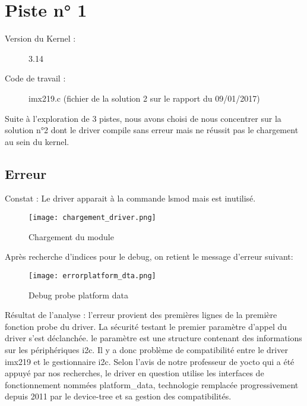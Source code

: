 \chapter{Piste n° 1} %
\label{Chapter2} %

\begin{description}
  \item[Version du Kernel :] 3.14
  \item[Code de travail :] imx219.c (fichier de la solution 2 sur le rapport du
  09/01/2017)
\end{description}

Suite à l'exploration de 3 pistes, nous avons choisi de nous
concentrer sur la solution n°2 dont le driver compile sans erreur mais ne
réussit pas le chargement au sein du kernel.

\section{Erreur}
Constat : Le driver apparait à la commande lsmod mais est inutilisé.

 \begin{figure}[th]
   \centering
   \texttt{[image: chargement\_driver.png]}
   \decoRule
   \caption{Chargement du module}  \label{fig:Chargement-du-module}
\end{figure}

Après recherche d'indices pour le debug, on retient le message d'erreur suivant:
\begin{figure}[th]
  \centering
  \texttt{[image: errorplatform\_dta.png]}
  \decoRule
  \caption{Debug probe platform data}  \label{fig:Debug-probe-platform-data}
\end{figure}

Résultat de l'analyse :
l'erreur provient des premières lignes de la première fonction probe du driver. La
sécurité testant le premier paramètre d'appel du driver s'est déclanchée. le
paramètre est une structure contenant des informations sur les périphériques i2c.
Il y a donc problème de compatibilité entre le driver imx219 et le gestionnaire i2c. Selon
l'avis de notre professeur de yocto qui a été appuyé par nos recherches,
le driver en question utilise les interfaces de fonctionnement nommées
platform\_data, technologie remplacée progressivement depuis 2011 par le
device-tree et sa gestion des compatibilités.

